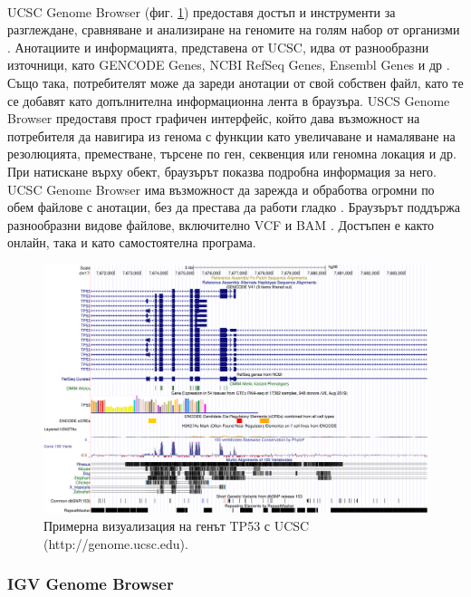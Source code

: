 \documentclass[pdftex,cyrillic,14pt,a4page,twoside,openright]{extreport}
\begin{document}
\paragraph{}
UCSC Genome Browser (фиг. \ref{fig:ucsc}) предоставя достъп и инструменти за разглеждане, сравняване и анализиране на геномите на голям набор от организми \cite{fujita2011}. Анотациите и информацията, представена от UCSC, идва от разнообразни източници, като GENCODE Genes, NCBI RefSeq Genes, Ensembl Genes и др \cite{navarro2021}. Също така, потребителят може да зареди анотации от свой собствен файл, като те се добавят като допълнителна информационна лента в браузъра. USCS Genome Browser предоставя прост графичен интерфейс, който дава възможност на потребителя да навигира из генома с функции като увеличаване и намаляване на резолюцията, преместване, търсене по ген, секвенция или геномна локация и др. При натискане върху обект, браузърът показва подробна информация за него. UCSC Genome Browser има възможност да зарежда и обработва огромни по обем файлове с анотации, без да престава да работи гладко \cite{kent2002human}. Браузърът поддържа разнообразни видове файлове, включително VCF \cite{navarro2021} и BAM \cite{fujita2011}. Достъпен е както онлайн, така и като самостоятелна програма.

\begin{figure}[h]
  \centering
  \includegraphics[width=16cm]{figures/UCSC}
  \caption {Примерна визуализация на генът TP53 с UCSC (http://genome.ucsc.edu).}
  \label{fig:ucsc}
\end{figure}

\subsubsection{IGV Genome Browser}\label{sec:igv}
\end{document}
